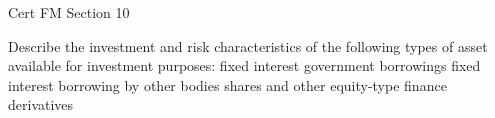 Cert FM Section 10

Describe the investment and risk characteristics of the following types of asset available for investment purposes: fixed interest government borrowings fixed interest borrowing by other bodies shares and other equity-type finance derivatives
